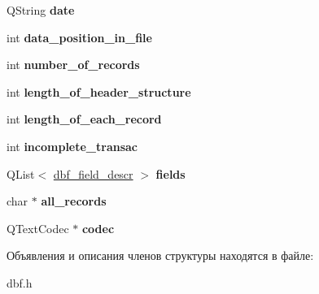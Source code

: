 \begin{DoxyCompactItemize}
\item 
\hypertarget{structdbf_header_aa87a7e1bf856ae7c9521ccc93afc5431}{\-Q\-String {\bfseries date}}\label{structdbf_header_aa87a7e1bf856ae7c9521ccc93afc5431}

\item 
\hypertarget{structdbf_header_a0803d31dcbde25f33359a642db84c39e}{int {\bfseries data\-\_\-position\-\_\-in\-\_\-file}}\label{structdbf_header_a0803d31dcbde25f33359a642db84c39e}

\item 
\hypertarget{structdbf_header_acc97aaed09659abbe394c55cc931e184}{int {\bfseries number\-\_\-of\-\_\-records}}\label{structdbf_header_acc97aaed09659abbe394c55cc931e184}

\item 
\hypertarget{structdbf_header_a0c4b28279bf63674b754a19d6078d8ce}{int {\bfseries length\-\_\-of\-\_\-header\-\_\-structure}}\label{structdbf_header_a0c4b28279bf63674b754a19d6078d8ce}

\item 
\hypertarget{structdbf_header_a15f396aef70cd5157a0876cfcf2feb62}{int {\bfseries length\-\_\-of\-\_\-each\-\_\-record}}\label{structdbf_header_a15f396aef70cd5157a0876cfcf2feb62}

\item 
\hypertarget{structdbf_header_a5fbaf8a0ccabc726e0176b79fd6d691c}{int {\bfseries incomplete\-\_\-transac}}\label{structdbf_header_a5fbaf8a0ccabc726e0176b79fd6d691c}

\item 
\hypertarget{structdbf_header_af7fdd620d22a9dbf985e921053e4ded7}{\-Q\-List$<$ \hyperlink{structdbf__field__descr}{dbf\-\_\-field\-\_\-descr} $>$ {\bfseries fields}}\label{structdbf_header_af7fdd620d22a9dbf985e921053e4ded7}

\item 
\hypertarget{structdbf_header_af625a38c637d06689aa99c75497af374}{char $\ast$ {\bfseries all\-\_\-records}}\label{structdbf_header_af625a38c637d06689aa99c75497af374}

\item 
\hypertarget{structdbf_header_a1514fa8fe8fd942cab943030fb1be16a}{\-Q\-Text\-Codec $\ast$ {\bfseries codec}}\label{structdbf_header_a1514fa8fe8fd942cab943030fb1be16a}

\end{DoxyCompactItemize}


Объявления и описания членов структуры находятся в файле\-:\begin{DoxyCompactItemize}
\item 
dbf.\-h\end{DoxyCompactItemize}
